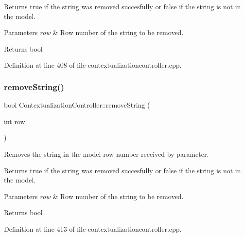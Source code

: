 Returns true if the string was removed succesfully or false if the string is not in the model. 
\begin{DoxyParams}{Parameters}
{\em row} & Row number of the string to be removed. \\
\hline
\end{DoxyParams}
\begin{DoxyReturn}{Returns}
bool 
\end{DoxyReturn}


Definition at line 408 of file contextualizationcontroller.\+cpp.

\mbox{\label{classContextualizationController_a0fb2ae8db12aba7888504f832bb63bd5}} 
\subsubsection{\texorpdfstring{remove\+String()}{removeString()}\hspace{0.1cm}{\footnotesize\ttfamily [2/2]}}
{\footnotesize\ttfamily bool Contextualization\+Controller\+::remove\+String (\begin{DoxyParamCaption}\item[{int}]{row }\end{DoxyParamCaption})\hspace{0.3cm}{\ttfamily [protected]}}



Removes the string in the model row number received by parameter. 

Returns true if the string was removed succesfully or false if the string is not in the model. 
\begin{DoxyParams}{Parameters}
{\em row} & Row number of the string to be removed. \\
\hline
\end{DoxyParams}
\begin{DoxyReturn}{Returns}
bool 
\end{DoxyReturn}


Definition at line 413 of file contextualizationcontroller.\+cpp.

\mbox{\label{classContextualizationController_a943a8703d6e67fa5a08b4b8d73697dfc}} 
